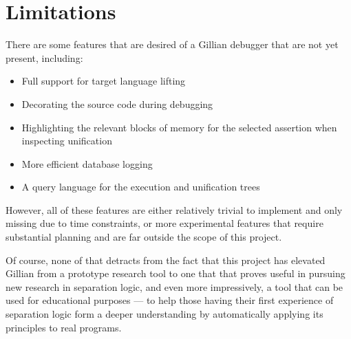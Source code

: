 \section{Limitations}%
\label{sec:eval:limitations}

There are some features that are desired of a Gillian debugger that are not yet
present, including:
\begin{itemize}
  \item Full support for target language lifting
  \item Decorating the source code during debugging
  \item Highlighting the relevant blocks of memory for the selected assertion
        when inspecting unification
  \item More efficient database logging
  \item A query language for the execution and unification trees
\end{itemize}

However, all of these features are either relatively trivial to implement and
only missing due to time constraints, or more experimental features that require
substantial planning and are far outside the scope of this project.

Of course, none of that detracts from the fact that this project has elevated
Gillian from a prototype research tool to one that that proves useful in
pursuing new research in separation logic, and even more impressively, a tool
that can be used for educational purposes --- to help those having their first
experience of separation logic form a deeper understanding by automatically
applying its principles to real programs.
